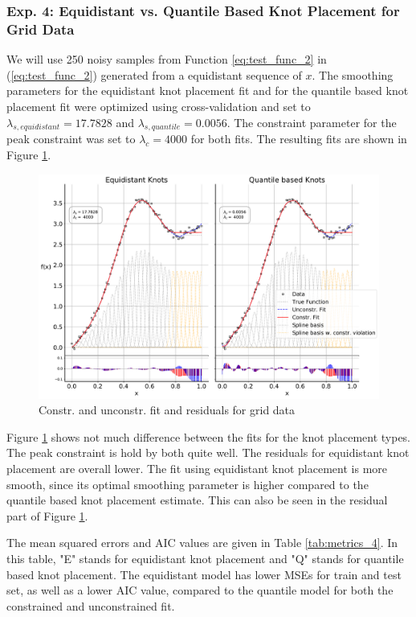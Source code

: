 \documentclass[10pt,a4paper]{article}
\begin{document}
\subsubsection{Exp. 4: Equidistant vs. Quantile Based Knot Placement for Grid Data}

We will use 250 noisy samples from Function \ref{eq:test_func_2} in (\ref{eq:test_func_2}) generated from a equidistant sequence of $x$. The smoothing parameters for the equidistant knot placement fit and for the quantile based knot placement fit were optimized using cross-validation and set to $\lambda_{s,equidistant} = 17.7828$ and $\lambda_{s, quantile} = 0.0056$. The constraint parameter for the peak constraint was set to $\lambda_c = 4000$ for both fits. The resulting fits are shown in Figure \ref{fig:fit_grid_250}.

\begin{figure}[H]
	\centering
	\includegraphics[width=\columnwidth]{../thesisplots/exp_grid/exp_grid_ndata_250_rseed_1.pdf}
	\caption{Constr. and unconstr. fit and residuals for grid data}
	\label{fig:fit_grid_250}
\end{figure}

Figure \ref{fig:fit_grid_250} shows not much difference between the fits for the knot placement types. The peak constraint is hold by both quite well. The residuals for  equidistant knot placement are overall lower. The fit using equidistant knot placement is more smooth, since its optimal smoothing parameter is higher compared to the quantile based knot placement estimate. This can also be seen in the residual part of Figure \ref{fig:fit_grid_250}. 

The mean squared errors and AIC values are given in Table \ref{tab:metrics_4}. In this table, "E" stands for equidistant knot placement and "Q" stands for quantile based knot placement. The equidistant model has lower MSEs for train and test set, as well as a lower AIC value, compared to the quantile model for both the constrained and unconstrained fit. 
\end{document}
